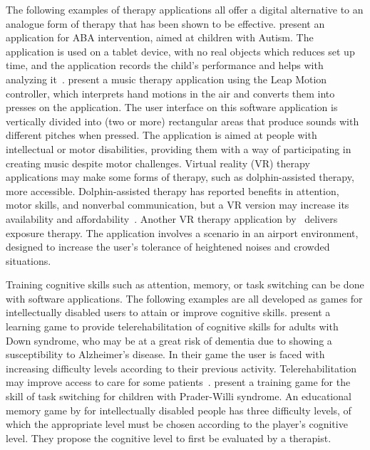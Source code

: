 \documentclass[utf8,english]{gradu3}
\begin{document}
The following examples of therapy applications all offer a digital alternative
to an analogue form of therapy that has been shown to be effective.
\textcite{artoni2018technology} present an application for ABA intervention,
aimed at children with Autism.
The application is used on a tablet device, with no real objects which reduces set up time,
and the application records the child's performance and helps with analyzing it~\parencite{artoni2018technology}.
\textcite{barate2018} present a music therapy application using the Leap Motion controller,
which interprets hand motions in the air and converts them into presses on the application.
The user interface on this software application is vertically divided into (two or more) rectangular areas
that produce sounds with different pitches when pressed.
The application is aimed at people with intellectual or motor disabilities, providing them with a
way of participating in creating music despite motor challenges.
Virtual reality (VR) therapy applications may make some forms of therapy, such as dolphin-assisted therapy, more accessible.
Dolphin-assisted therapy has reported benefits in attention, motor skills, and nonverbal communication,
but a VR version may increase its availability and affordability~\parencite{cai2013}.
Another VR therapy application by~\textcite{poyade2019isensevr} delivers exposure therapy.
The application involves a scenario in an airport environment, designed to increase the user's
tolerance of heightened noises and crowded situations.

Training cognitive skills such as attention, memory, or task switching can be done with software applications.
The following examples are all developed as games for intellectually disabled users to attain or improve cognitive skills.
\textcite{bargagna2014} present a learning game to provide telerehabilitation of cognitive skills for adults with Down syndrome,
who may be at a great risk of dementia due to showing a susceptibility to Alzheimer's disease.
In their game the user is faced with increasing difficulty levels according to their previous activity.
Telerehabilitation may improve access to care for some patients~\parencite{bargagna2014}.
\textcite{robb2019} present a training game for the skill of task switching for children with Prader-Willi syndrome.
An educational memory game by \textcite{segatto2017} for intellectually disabled people
has three difficulty levels, of which the appropriate level must be chosen according to the player's cognitive level.
They propose the cognitive level to first be evaluated by a therapist.
\end{document}
